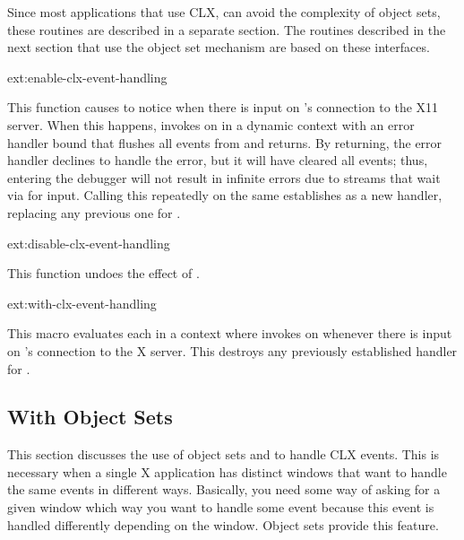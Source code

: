 Since most applications that use CLX, can avoid the complexity of object sets,
these routines are described in a separate section.  The routines described in
the next section that use the object set mechanism are based on these
interfaces.

\begin{defun}{ext:}{enable-clx-event-handling}{%
    } 
  
  This function causes  to notice when there
  is input on 's connection to the X11 server.  When this
  happens,  invokes  on
   in a dynamic context with an error handler bound that
  flushes all events from  and returns.  By returning,
  the error handler declines to handle the error, but it will have
  cleared all events; thus, entering the debugger will not result in
  infinite errors due to streams that wait via
   for input.  Calling this repeatedly on the
  same  establishes  as a new handler,
  replacing any previous one for .
\end{defun}

\begin{defun}{ext:}{disable-clx-event-handling}{}

  This function undoes the effect of
  .
\end{defun}

\begin{defmac}{ext:}{with-clx-event-handling}{%
    }
  
  This macro evaluates each  in a context where
   invokes  on 
  whenever there is input on 's connection to the X
  server.  This destroys any previously established handler for
  .
\end{defmac}


\subsection{With Object Sets}

This section discusses the use of object sets and
 to handle CLX events.  This is necessary
when a single X application has distinct windows that want to handle
the same events in different ways.  Basically, you need some way of
asking for a given window which way you want to handle some event
because this event is handled differently depending on the window.
Object sets provide this feature.

